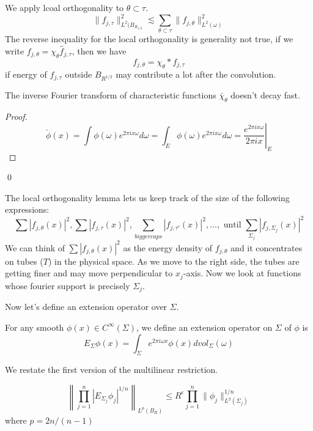 We apply lcoal orthogonality to $\theta\subset\tau$. 
\begin{equation*}
    \|f_{j,\tau}\|_{L^2(B_{R_{1/2}}}^2\lesssim \sum_{\theta\subset\tau}\|f_{j,\theta}\|_{L^2(\omega)}^2
\end{equation*}
The reverse inequality for the local orthogonality is generality not true, if we write $f_{j,\theta}=\chi_\theta\widehat{f}_{j,\tau}$, then we have
\begin{equation*}
    f_{j,\theta}=\chi_\theta\ast f_{j,\tau}
\end{equation*}
if energy of $f_{j,\tau}$ outside $B_{R^{1/2}}$ may contribute a lot after the convolution. 
\begin{proposition}
    The inverse Fourier transform of characteristic functions $\check{\chi_\theta}$ doesn't decay fast. 
\end{proposition}
\begin{proof}
\begin{equation*}
    \check{\phi}(x)=\int\phi(\omega)e^{2\pi ix\omega}d\omega=\int_E\phi(\omega)e^{2\pi ix\omega}d\omega=\left.\frac{e^{2\pi ix\omega}}{2\pi ix}\right\vert_E
\end{equation*}
\end{proof}
\qed

The local orthogonality lemma lets us keep track of the size of the following expressions:
\begin{equation*}
    \sum|f_{j,\theta}(x)|^2, \sum|f_{j,\tau}(x)|^2, \sum_{bigger caps}|f_{j,\tau'}(x)|^2,..., \text{ until } \sum_{\Sigma_j}|f_{j,\Sigma_j}(x)|^2
\end{equation*}
We can think of $\sum|f_{j,\theta}(x)|^2$ as the energy density of $f_{j,\theta}$ and it concentrates on tubes ($T$) in the physical space. As we move to the right side, the tubes are getting finer and may move perpendicular to $x_j$-axis. Now we look at functions whose fourier support is precisely $\Sigma_j$.

Now let's define an extension operator over $\Sigma$.
\begin{definition}
    For any smooth $\phi(x)\in C^\infty(\Sigma)$, we define an extension operator on $\Sigma$ of $\phi$ is 
    \begin{equation*}
        E_\Sigma\phi(x)=\int_\Sigma e^{2\pi i\omega x}\phi(x)dvol_\Sigma(\omega)
    \end{equation*}
\end{definition}

We restate the first version of the multilinear restriction.
\begin{theorem}
\begin{equation*}
    \left\|\prod_{j=1}^n|E_{\Sigma_j}\phi_j|^{1/n} \right\|_{L^p(B_R)}\leq R^\epsilon\prod_{j=1}^n\|\phi_j\|_{L^2(\Sigma_j)}^{1/n}
\end{equation*}
where $p=2n/(n-1)$
\end{theorem}


